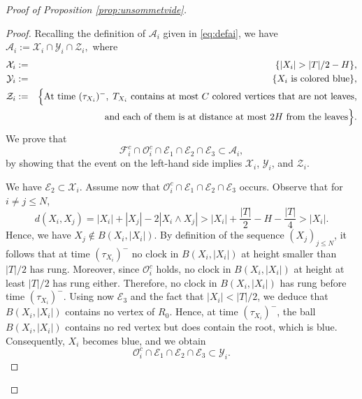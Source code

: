 \documentclass[10pt,a4paper]{amsart}
\newcommand{\Tf}{T}
\begin{document}
\begin{proof}[Proof of Proposition \ref{prop:unsommetvide}]
\begin{proof}
Recalling the definition of $\mathcal{A}_i$ given in \eqref{eq:defai}, we have
$
\mathcal{A}_i := \mathcal{X}_i \cap \mathcal{Y}_i \cap \mathcal{Z}_i,
$
where
\begin{eqnarray*}
\mathcal{X}_i &:=& \{|X_i|>|\Tf|/2-H\},\\
\mathcal{Y}_i &:=& \{\text{$X_i$ is colored blue}\},\\
\mathcal{Z}_i &:=& \Bigl\{\text{At time } (\tau_{X_i})^{-},\; \Tf_{X_i} \text{ contains at most } C \text{ colored vertices that are not leaves,}\\
&& \qquad\quad \text{and each of them is at distance at most } 2H \text{ from the leaves}\Bigr\}.
\end{eqnarray*}
We prove that
$$
\mathcal{F}_i^c \cap \mathcal{O}_i^c \cap \mathcal{E}_1 \cap \mathcal{E}_2 \cap \mathcal{E}_3 \subset \mathcal{A}_i,
$$
by showing that the event on the left-hand side implies $\mathcal{X}_i$, $\mathcal{Y}_i$, and $\mathcal{Z}_i$.

\medskip

\noindent We have $\mathcal{E}_2 \subset \mathcal{X}_i$. Assume now that $\mathcal{O}_i^c \cap \mathcal{E}_1 \cap \mathcal{E}_2 \cap \mathcal{E}_3$ occurs. Observe that for $i \neq j \le N$,
$$
d(X_i,X_j)
= |X_i| + |X_j| - 2|X_i \wedge X_j|
> |X_i| + \frac{|\Tf|}{2} - H - \frac{|\Tf|}{4}
> |X_i|.
$$
Hence, we have $X_j \notin B(X_i,|X_i|)$. By definition of the sequence $(X_j)_{j\le N}$, it follows that at time $(\tau_{X_i})^{-}$ no clock in $B(X_i,|X_i|)$ at height smaller than $|\Tf|/2$ has rung. Moreover, since $\mathcal{O}_i^c$ holds, no clock in $B(X_i,|X_i|)$ at height at least $|\Tf|/2$ has rung either. Therefore, no clock in $B(X_i,|X_i|)$ has rung before time $(\tau_{X_i})^{-}$. Using now $\mathcal{E}_3$ and the fact that $|X_i|<|\Tf|/2$, we deduce that $B(X_i,|X_i|)$ contains no vertex of $R_0$. Hence, at time $(\tau_{X_i})^{-}$, the ball $B(X_i,|X_i|)$ contains no red vertex but does contain the root, which is blue. Consequently, $X_i$ becomes blue, and we obtain
$$
\mathcal{O}_i^c \cap \mathcal{E}_1 \cap \mathcal{E}_2 \cap \mathcal{E}_3 \subset \mathcal{Y}_i.
$$


\end{proof}
\end{proof}
\end{document}
